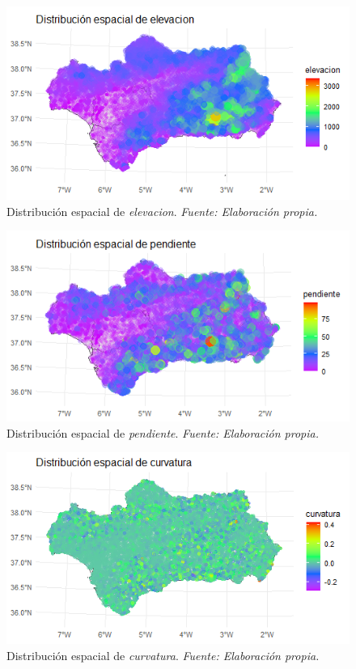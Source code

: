 \documentclass[12pt,a4paper,]{book}
\numberwithin{dummy}{section}
\theoremstyle{ocrenumbox}
\theoremstyle{blacknumex}
\theoremstyle{blacknumbox}
\theoremstyle{ocrenum}
\theoremstyle{ocrenum}
\begin{document}
\begin{figure}[H]
\centering
\includegraphics[width = \textwidth]{graficos/elevacion_spat.png}
\caption[Distribución espacial de \textit{elevacion}]{Distribución espacial de \textit{elevacion}. \it Fuente: Elaboración propia.}
\label{fig:elevacion_spat}
\end{figure}

\begin{figure}[H]
\centering
\includegraphics[width = \textwidth]{graficos/pendiente_spat.png}
\caption[Distribución espacial de \textit{pendiente}]{Distribución espacial de \textit{pendiente}. \it Fuente: Elaboración propia.}
\label{fig:pendiente_spat}
\end{figure}

\begin{figure}[H]
\centering
\includegraphics[width = \textwidth]{graficos/curvatura_spat.png}
\caption[Distribución espacial de \textit{curvatura}]{Distribución espacial de \textit{curvatura}. \it Fuente: Elaboración propia.}
\label{fig:curvatura_spat}
\end{figure}
\end{document}
